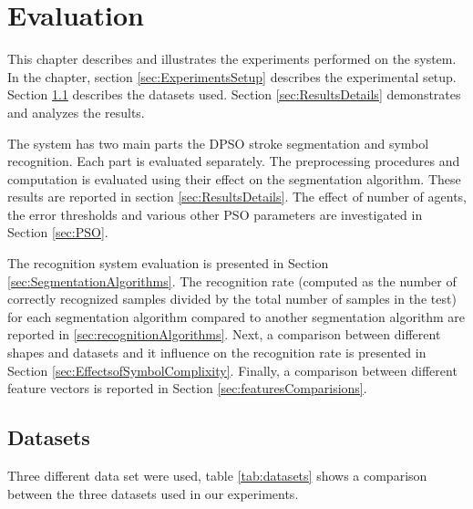 
\chapter{Evaluation}
\label{sec:Evaluation}
This chapter describes and illustrates the experiments performed on the system. In the chapter, section \ref{sec:ExperimentsSetup} describes the experimental setup. Section \ref{sec:Datasets} describes the datasets used. Section \ref{sec:ResultsDetails} demonstrates and analyzes the results. 

The system has two main parts the DPSO stroke segmentation and symbol recognition. Each part is evaluated separately. The preprocessing procedures and computation is evaluated using their effect on the segmentation algorithm. These results are reported in section \ref{sec:ResultsDetails}. The effect of number of agents, the error thresholds and various other PSO parameters are investigated in Section \ref{sec:PSO}. %

The recognition system evaluation is presented in Section \ref{sec:SegmentationAlgorithms}. The recognition rate (computed as the number of correctly recognized samples divided by the total number of samples in the test) for each segmentation algorithm compared to another segmentation algorithm are reported in \ref{sec:recognitionAlgorithms}. Next, a comparison between different shapes and datasets and it influence on the recognition rate is presented in Section \ref{sec:EffectsofSymbolComplixity}. Finally, a comparison between different feature vectors is reported in Section \ref{sec:featuresComparisions}.

\section{Datasets}
\label{sec:Datasets}
Three different data set were used, table \ref{tab:datasets} shows a comparison between the three datasets used in our experiments. 

